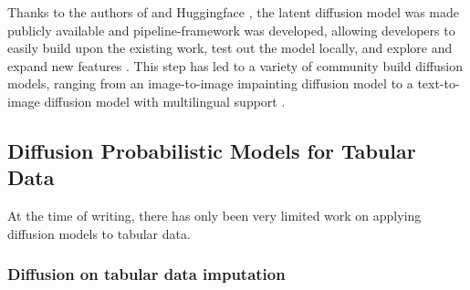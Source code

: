 Thanks to the authors of \cite{rombach2022HighResolutionImageSynthesis} and Huggingface \cite{2023HuggingFaceAI}, the latent diffusion model was made publicly available and
pipeline-framework was developed, allowing developers to easily build upon the existing work, test out the model locally, and explore and expand new features \cite{huggingface2023DiffusersPipelines}.
This step has led to a variety of community build diffusion models, ranging from an image-to-image impainting diffusion model to a text-to-image diffusion model with multilingual support \cite{CommunityExamples}.




\subsection{Diffusion Probabilistic Models for Tabular Data}
\label{ch:preliminaries-generativeAlgorithms-diffusionProbabilisticModelsTabularData}
At the time of writing, there has only been very limited work on applying diffusion models to tabular data.

\subsubsection{Diffusion on tabular data imputation}

